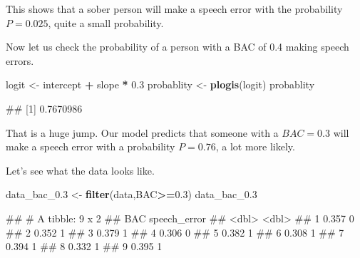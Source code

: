 \documentclass[
]{book}
\newenvironment{Shaded}{\begin{snugshade}}{\end{snugshade}}
\newcommand{\FloatTok}[1]{\textcolor[rgb]{0.00,0.00,0.81}{#1}}
\newcommand{\FunctionTok}[1]{\textcolor[rgb]{0.13,0.29,0.53}{\textbf{#1}}}
\newcommand{\NormalTok}[1]{#1}
\newcommand{\OtherTok}[1]{\textcolor[rgb]{0.56,0.35,0.01}{#1}}
\newcommand{\SpecialCharTok}[1]{\textcolor[rgb]{0.81,0.36,0.00}{\textbf{#1}}}
\begin{document}
This shows that a sober person will make a speech error with the probability \(P=0.025\), quite a small probability.

Now let us check the probability of a person with a BAC of 0.4 making speech errors.

\begin{Shaded}
\begin{Highlighting}[]
\NormalTok{logit }\OtherTok{\textless{}{-}}\NormalTok{ intercept }\SpecialCharTok{+}\NormalTok{ slope }\SpecialCharTok{*} \FloatTok{0.3}
\NormalTok{probablity }\OtherTok{\textless{}{-}} \FunctionTok{plogis}\NormalTok{(logit)}
\NormalTok{probablity}
\end{Highlighting}
\end{Shaded}

\begin{Shaded}
\begin{Highlighting}[]
\NormalTok{\#\# [1] 0.7670986}
\end{Highlighting}
\end{Shaded}

That is a huge jump. Our model predicts that someone with a \(BAC = 0.3\) will make a speech error with a probability \(P = 0.76\), a lot more likely.

Let's see what the data looks like.

\begin{Shaded}
\begin{Highlighting}[]
\NormalTok{data\_bac\_0}\FloatTok{.3} \OtherTok{\textless{}{-}} \FunctionTok{filter}\NormalTok{(data,BAC}\SpecialCharTok{\textgreater{}=}\FloatTok{0.3}\NormalTok{)}
\NormalTok{data\_bac\_0}\FloatTok{.3}
\end{Highlighting}
\end{Shaded}

\begin{Shaded}
\begin{Highlighting}[]
\NormalTok{\#\# \# A tibble: 9 x 2}
\NormalTok{\#\#     BAC speech\_error}
\NormalTok{\#\#   \textless{}dbl\textgreater{}        \textless{}dbl\textgreater{}}
\NormalTok{\#\# 1 0.357            0}
\NormalTok{\#\# 2 0.352            1}
\NormalTok{\#\# 3 0.379            1}
\NormalTok{\#\# 4 0.306            0}
\NormalTok{\#\# 5 0.382            1}
\NormalTok{\#\# 6 0.308            1}
\NormalTok{\#\# 7 0.394            1}
\NormalTok{\#\# 8 0.332            1}
\NormalTok{\#\# 9 0.395            1}
\end{Highlighting}
\end{Shaded}
\end{document}
